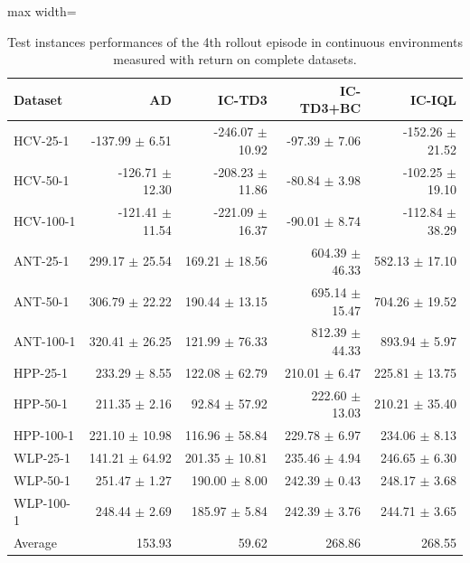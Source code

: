\documentclass{article}
\begin{document}
\begin{table}[ht]
    \label{tab:}
    \begin{center}
    \caption{Test instances performances of the 4th rollout episode in continuous environments measured with return on complete datasets.}
    \begin{small}
    \begin{adjustbox}{max width=\columnwidth}
		\begin{tabular}{l|rrrr}
		\toprule
	\textbf{Dataset} & \textbf{AD} & \textbf{IC-TD3} & \textbf{IC-TD3+BC} & \textbf{IC-IQL}\\
\midrule
HCV-25-1 & -137.99 $\pm$ 6.51 & -246.07 $\pm$ 10.92 & -97.39 $\pm$ 7.06 & -152.26 $\pm$ 21.52\\
HCV-50-1 & -126.71 $\pm$ 12.30 & -208.23 $\pm$ 11.86 & -80.84 $\pm$ 3.98 & -102.25 $\pm$ 19.10\\
HCV-100-1 & -121.41 $\pm$ 11.54 & -221.09 $\pm$ 16.37 & -90.01 $\pm$ 8.74 & -112.84 $\pm$ 38.29\\
ANT-25-1 & 299.17 $\pm$ 25.54 & 169.21 $\pm$ 18.56 & 604.39 $\pm$ 46.33 & 582.13 $\pm$ 17.10\\
ANT-50-1 & 306.79 $\pm$ 22.22 & 190.44 $\pm$ 13.15 & 695.14 $\pm$ 15.47 & 704.26 $\pm$ 19.52\\
ANT-100-1 & 320.41 $\pm$ 26.25 & 121.99 $\pm$ 76.33 & 812.39 $\pm$ 44.33 & 893.94 $\pm$ 5.97\\
HPP-25-1 & 233.29 $\pm$ 8.55 & 122.08 $\pm$ 62.79 & 210.01 $\pm$ 6.47 & 225.81 $\pm$ 13.75\\
HPP-50-1 & 211.35 $\pm$ 2.16 & 92.84 $\pm$ 57.92 & 222.60 $\pm$ 13.03 & 210.21 $\pm$ 35.40\\
HPP-100-1 & 221.10 $\pm$ 10.98 & 116.96 $\pm$ 58.84 & 229.78 $\pm$ 6.97 & 234.06 $\pm$ 8.13\\
WLP-25-1 & 141.21 $\pm$ 64.92 & 201.35 $\pm$ 10.81 & 235.46 $\pm$ 4.94 & 246.65 $\pm$ 6.30\\
WLP-50-1 & 251.47 $\pm$ 1.27 & 190.00 $\pm$ 8.00 & 242.39 $\pm$ 0.43 & 248.17 $\pm$ 3.68\\
WLP-100-1 & 248.44 $\pm$ 2.69 & 185.97 $\pm$ 5.84 & 242.39 $\pm$ 3.76 & 244.71 $\pm$ 3.65\\
\midrule
Average & 153.93 & 59.62 & 268.86 & 268.55\\
\end{tabular}
        \end{adjustbox}
    \end{small}
    \end{center}
    \vskip -0.1in
\end{table}
\FloatBarrier
\end{document}

